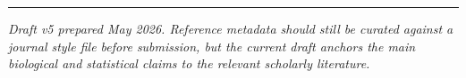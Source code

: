 \documentclass[11pt]{article}
\begin{document}
\vspace{1em}
\begin{center}
\rule{0.4\textwidth}{0.4pt}
\end{center}
\vspace{0.3em}
\noindent\textit{Draft v5 prepared May 2026. Reference metadata should still be curated against a journal style file before submission, but the current draft anchors the main biological and statistical claims to the relevant scholarly literature.}
\end{document}
